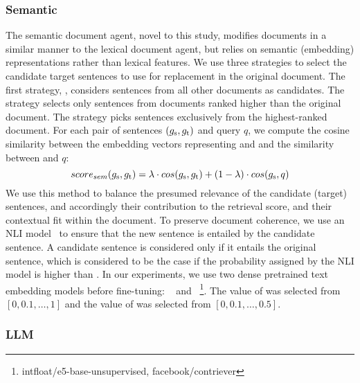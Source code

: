 \subsubsection*{Semantic}
The semantic document agent, novel to this study, modifies documents in a similar manner to the lexical document agent, but relies on semantic (embedding) representations rather than lexical features. 
We
use three strategies to select the candidate target sentences to use
for replacement in the original document.
The first strategy, \firstmention{\all}, considers sentences from all
other documents as candidates.  The \firstmention{\better} strategy
selects only sentences from documents ranked higher than the original
document.  The \firstmention{\best} strategy picks sentences
exclusively from the highest-ranked document.  For each pair of
sentences $(g_{\text{s}}, g_{\text{t}})$ and query $q$, we
compute the cosine similarity between the embedding vectors
representing \SrcSentence and \TargetSentence and the similarity between \TargetSentence and $q$: 
\begin{equation*}
    score_{sem}(g_{\text{s}}, g_{\text{t}}) = \lambda \cdot cos(g_{\text{s}}, g_{\text{t}}) + (1-\lambda) \cdot cos(g_{\text{s}}, q)
\end{equation*}
We use this method to balance the presumed relevance of the candidate (target)
sentences, and accordingly their contribution to the retrieval score, and their
contextual fit within the document.  To preserve document coherence,
we use an NLI model~\cite{NLI} to ensure that the new sentence is entailed
by the candidate sentence. A candidate sentence is considered only if
it entails the original sentence, which is considered to be the case
if the probability assigned by the NLI model is higher
than \firstmention{\nlithreshold}.  In our experiments, we use two
dense pretrained text embedding models before
fine-tuning: \efive~\cite{e5}
and \contriever~\cite{contriever}\footnote{intfloat/e5-base-unsupervised,
facebook/contriever}.
The value of \interpolation was selected from $[0, 0.1,\ldots,1]$ and the value of \nlithreshold was selected from $[0,0.1,\ldots,0.5]$. 

\subsubsection*{LLM}

